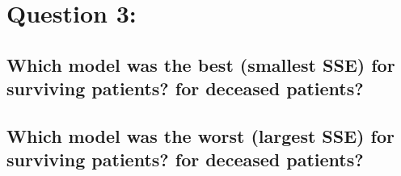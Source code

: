 \documentclass[../../assignment4.tex]{subfiles}
\begin{document}
    \section{Question 3: {}} \label{sec:question3}


    \subsection{Which model was the best (smallest SSE) for surviving patients? for deceased patients?} \label{subsec:question3.1}


    \subsection{Which model was the worst (largest SSE) for surviving patients? for deceased patients?} \label{subsec:question3.2}

\end{document}
